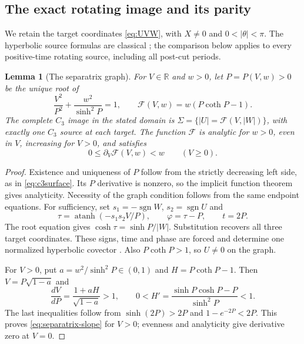 \documentclass[11pt,a4paper]{article}
\newtheorem{lemma}[theorem]{Lemma}
\theoremstyle{remark}\newtheorem{remark}[theorem]{Remark}
\newcommand{\atanh}{\operatorname{atanh}}
\begin{document}
\subsection{The exact rotating image and its parity}
\label{sec:rotating-image}

We retain the target coordinates \eqref{eq:UVW}, with
$X\ne0$ and $0<|\theta|<\pi$. The hyperbolic source formulas are
classical \cite[Section 3.3]{MS}; the comparison below applies to
every positive-time rotating source, including all post-cut periods.

\begin{lemma}[The separatrix graph]\label{lem:separatrix-graph}
For $V\in\mathbb R$ and $w>0$, let $P=P(V,w)>0$ be the unique root of
\[
 \frac{V^2}{P^2}+\frac{w^2}{\sinh^2P}=1,
 \qquad \mathcal F(V,w)=w(P\coth P-1).
\]
The complete $C_3$ image in the stated domain is
$\Sigma=\{|U|=\mathcal F(V,|W|)\}$, with exactly one $C_3$ source
at each target. The function $\mathcal F$ is analytic for $w>0$, even
in $V$, increasing for $V>0$, and satisfies
\begin{equation}\label{eq:separatrix-slope}
 0\le\partial_V\mathcal F(V,w)<w\qquad(V\ge0).
\end{equation}
\end{lemma}
\begin{proof}
Existence and uniqueness of $P$ follow from the strictly decreasing
left side, as in \eqref{eq:c3surface}. Its $P$ derivative is nonzero,
so the implicit function theorem gives analyticity. Necessity of the
graph condition follows from the same endpoint equations. For sufficiency,
set $s_1=-\operatorname{sgn}W$, $s_2=\operatorname{sgn}U$ and
\[
 \tau=\atanh(-s_1s_2V/P),\qquad \varphi=\tau-P,\qquad t=2P.
\]
The root equation gives $\cosh\tau=\sinh P/|W|$. Substitution
recovers all three target coordinates. These signs, time and phase are
forced and determine one normalized hyperbolic covector \cite{MS}.
Also $P\coth P>1$, so $U\ne0$ on the graph.

For $V>0$, put $a=w^2/\sinh^2P\in(0,1)$ and $H=P\coth P-1$.
Then $V=P\sqrt{1-a}$ and
\[
 \frac{dV}{dP}=\frac{1+aH}{\sqrt{1-a}}>1,
 \qquad 0<H'=\frac{\sinh P\cosh P-P}{\sinh^2P}<1.
\]
The last inequalities follow from $\sinh(2P)>2P$ and
$1-e^{-2P}<2P$. This proves \eqref{eq:separatrix-slope} for $V>0$;
evenness and analyticity give derivative zero at $V=0$.
\end{proof}
\end{document}
